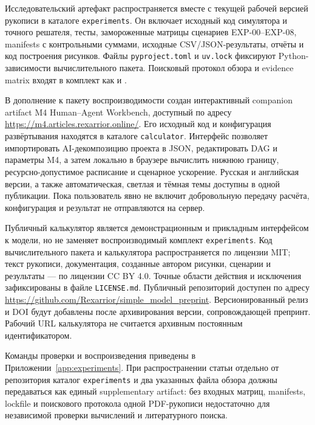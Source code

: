 Исследовательский артефакт распространяется вместе с текущей рабочей версией
рукописи в каталоге \texttt{experiments}. Он включает исходный код симулятора
и точного решателя, тесты, замороженные матрицы сценариев EXP-00--EXP-08,
manifests с контрольными суммами, исходные CSV/JSON-результаты, отчёты и код
построения рисунков. Файлы \texttt{pyproject.toml} и \texttt{uv.lock}
фиксируют Python-зависимости вычислительного пакета. Поисковый протокол обзора
и evidence matrix входят в комплект как
 и
.

В дополнение к пакету воспроизводимости создан интерактивный companion
artifact M4 Human--Agent Workbench, доступный по адресу
\url{https://m4.articles.rexarrior.online/}. Его исходный код и конфигурация
развёртывания находятся в каталоге \texttt{calculator}. Интерфейс позволяет
импортировать AI-декомпозицию проекта в JSON, редактировать DAG и параметры
M4, а затем локально в браузере вычислить нижнюю границу, ресурсно-допустимое
расписание и сценарное ускорение. Русская и английская версии, а также
автоматическая, светлая и тёмная темы доступны в одной публикации. Пока
пользователь явно не включит добровольную передачу расчёта, конфигурация и
результат не отправляются на сервер.

Публичный калькулятор является демонстрационным и прикладным интерфейсом к
модели, но не заменяет воспроизводимый комплект \texttt{experiments}. Код
вычислительного пакета и калькулятора распространяется по лицензии MIT; текст
рукописи, документация, созданные автором рисунки, сценарии и результаты --- по
лицензии CC BY 4.0. Точные области действия и исключения зафиксированы в файле
\texttt{LICENSE.md}. Публичный репозиторий доступен по адресу
\url{https://github.com/Rexarrior/simple_model_preprint}. Версионированный
релиз и DOI будут добавлены после архивирования версии, сопровождающей препринт.
Рабочий URL калькулятора не считается архивным постоянным идентификатором.

Команды проверки и воспроизведения приведены в
Приложении~\ref{app:experiments}. При распространении статьи отдельно от
репозитория каталог \texttt{experiments} и два указанных файла обзора должны
передаваться как единый supplementary artifact: без входных матриц, manifests,
lockfile и поискового протокола одной PDF-рукописи недостаточно для независимой
проверки вычислений и литературного поиска.
